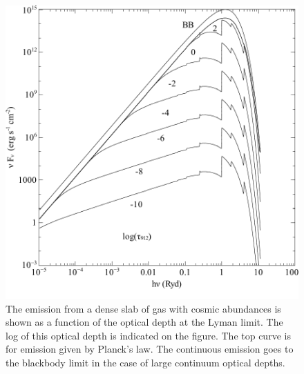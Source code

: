 \begin{figure}
\label{fig:HConEmissBBLimit}
\centering
\includegraphics{HConEmissBBLimit}
\caption[H emission in black body limit]
{The emission from a dense slab of gas with cosmic abundances is
shown as a function of the optical depth at the Lyman limit.  The log of
this optical depth is indicated on the figure.  The top curve is for emission
given by Planck's law.  The continuous emission goes to the blackbody limit
in the case of large continuum optical depths.}
\end{figure}

